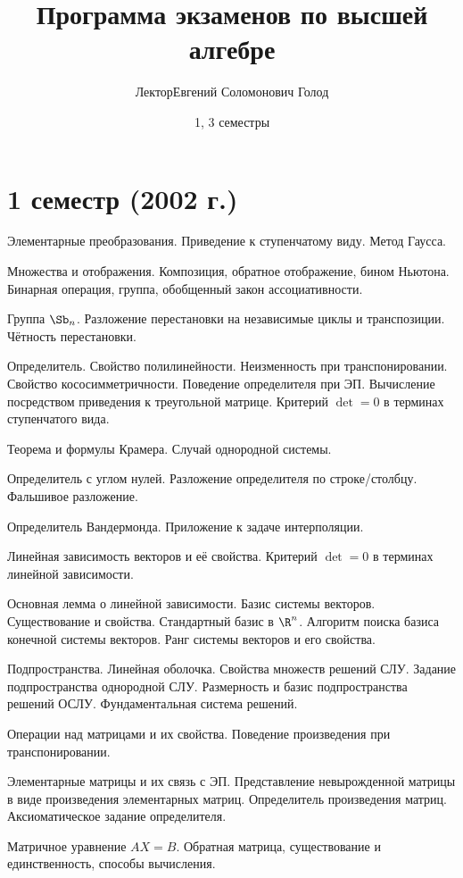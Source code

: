 \documentclass[a4paper]{article}
\title{Программа экзаменов по высшей алгебре}
\author{Лектор\т Евгений Соломонович Голод}
\date{1, 3 семестры}
\begin{document}
\maketitle

\section*{1 семестр (2002 г.)}

\begin{nums}{0}
\item Элементарные преобразования. Приведение к ступенчатому виду. Метод Гаусса.
\item Множества и отображения. Композиция, обратное отображение, бином Ньютона. Бинарная операция, группа,
обобщенный закон ассоциативности.
\item Группа $\Sb_n$. Разложение перестановки на независимые циклы и транспозиции. Чётность перестановки.
\item Определитель. Свойство полилинейности. Неизменность при транспонировании. Свойство кососимметричности.
Поведение определителя при ЭП.
Вычисление посредством приведения к треугольной матрице. Критерий $\det=0$ в терминах ступенчатого вида.
\item Теорема и формулы Крамера. Случай однородной системы.
\item Определитель с углом нулей. Разложение определителя по строке/столбцу. Фальшивое разложение.
\item Определитель Вандермонда. Приложение к задаче интерполяции.
\item Линейная зависимость векторов и её свойства. Критерий $\det=0$ в терминах линейной зависимости.
\item Основная лемма о линейной зависимости. Базис системы векторов. Существование и свойства. Стандартный
базис в $\R^n$. Алгоритм поиска базиса
конечной системы векторов. Ранг системы векторов и его свойства.
\item Подпространства. Линейная оболочка. Свойства множеств решений СЛУ. Задание подпространства однородной
СЛУ. Размерность и базис
подпространства решений ОСЛУ. Фундаментальная система решений.
\item Операции над матрицами и их свойства. Поведение произведения при транспонировании.
\item Элементарные матрицы и их связь с ЭП. Представление невырожденной матрицы в виде произведения элементарных
матриц. Определитель произведения матриц. Аксиоматическое задание определителя.
\item Матричное уравнение $AX=B$. Обратная матрица, существование и единственность, способы вычисления.

\end{nums}
\end{document}
